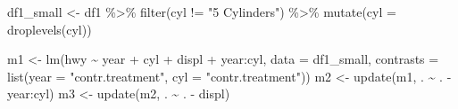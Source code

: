 \documentclass[
  11pt,
  a4paper,
  twoside]{scrbook}
\newenvironment{Shaded}{\begin{snugshade}}{\end{snugshade}}
\newcommand{\AttributeTok}[1]{\textcolor[rgb]{0.77,0.63,0.00}{#1}}
\newcommand{\FunctionTok}[1]{\textcolor[rgb]{0.00,0.00,0.00}{#1}}
\newcommand{\NormalTok}[1]{#1}
\newcommand{\OtherTok}[1]{\textcolor[rgb]{0.56,0.35,0.01}{#1}}
\newcommand{\SpecialCharTok}[1]{\textcolor[rgb]{0.00,0.00,0.00}{#1}}
\newcommand{\StringTok}[1]{\textcolor[rgb]{0.31,0.60,0.02}{#1}}
\begin{document}
\begin{Shaded}
\begin{Highlighting}[]
\NormalTok{df1\_small }\OtherTok{\textless{}{-}}\NormalTok{ df1 }\SpecialCharTok{\%\textgreater{}\%} \FunctionTok{filter}\NormalTok{(cyl }\SpecialCharTok{!=} \StringTok{"5 Cylinders"}\NormalTok{) }\SpecialCharTok{\%\textgreater{}\%} 
    \FunctionTok{mutate}\NormalTok{(}\AttributeTok{cyl =} \FunctionTok{droplevels}\NormalTok{(cyl))}

\NormalTok{m1 }\OtherTok{\textless{}{-}} \FunctionTok{lm}\NormalTok{(hwy }\SpecialCharTok{\textasciitilde{}}\NormalTok{ year }\SpecialCharTok{+}\NormalTok{ cyl }\SpecialCharTok{+}\NormalTok{ displ }\SpecialCharTok{+}\NormalTok{ year}\SpecialCharTok{:}\NormalTok{cyl, }
         \AttributeTok{data =}\NormalTok{ df1\_small, }
         \AttributeTok{contrasts =} \FunctionTok{list}\NormalTok{(}\AttributeTok{year =} \StringTok{"contr.treatment"}\NormalTok{,}
                          \AttributeTok{cyl =} \StringTok{"contr.treatment"}\NormalTok{))}
\NormalTok{m2 }\OtherTok{\textless{}{-}} \FunctionTok{update}\NormalTok{(m1, . }\SpecialCharTok{\textasciitilde{}}\NormalTok{ . }\SpecialCharTok{{-}}\NormalTok{ year}\SpecialCharTok{:}\NormalTok{cyl)}
\NormalTok{m3 }\OtherTok{\textless{}{-}} \FunctionTok{update}\NormalTok{(m2, . }\SpecialCharTok{\textasciitilde{}}\NormalTok{ . }\SpecialCharTok{{-}}\NormalTok{ displ)}


\end{Highlighting}
\end{Shaded}
\end{document}
